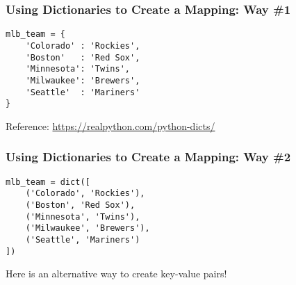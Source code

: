 \documentclass[14pt,aspectratio=169]{beamer}
\begin{document}
%
\begin{frame}[fragile]
  \frametitle{Using Dictionaries to Create a Mapping: Way \#1}
  \hspace*{.1in}
  \begin{minipage}{6in}
    \vspace*{.25in}
    \begin{verbatim}
mlb_team = {
    'Colorado' : 'Rockies',
    'Boston'   : 'Red Sox',
    'Minnesota': 'Twins',
    'Milwaukee': 'Brewers',
    'Seattle'  : 'Mariners'
}
    \end{verbatim}
  \end{minipage}
  \vspace*{.025in}
  \begin{center}
    \normalsize \noindent Reference: \url{https://realpython.com/python-dicts/} \\
  \end{center}
\end{frame}

%
\begin{frame}[fragile]
  \frametitle{Using Dictionaries to Create a Mapping: Way \#2}
  \hspace*{.1in}
  \begin{minipage}{6in}
    \vspace*{.25in}
    \begin{verbatim}
mlb_team = dict([
    ('Colorado', 'Rockies'),
    ('Boston', 'Red Sox'),
    ('Minnesota', 'Twins'),
    ('Milwaukee', 'Brewers'),
    ('Seattle', 'Mariners')
])
    \end{verbatim}
  \end{minipage}
  \vspace*{.025in}
  \begin{center}
    \normalsize \noindent Here is an alternative way to create key-value pairs! \\
  \end{center}
\end{frame}
\end{document}

